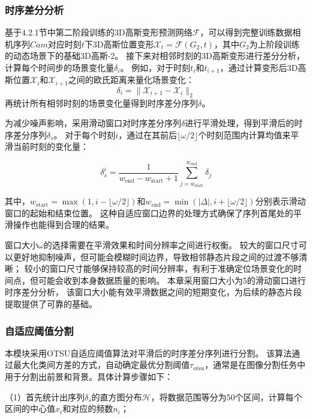 \subsubsection{时序差分分析}
基于4.2.1节中第二阶段训练的3D高斯变形预测网络$\mathcal{F}$，可以得到完整训练数据相机序列$Cam$对应时刻$t$下3D高斯位置变形$\mathcal{X}_t=\mathcal{F}(G_2, t)$，其中$G_2$为上阶段训练的动态场景下的基础3D高斯-2。
接下来对相邻时刻的3D高斯变形进行差分分析，计算每个时间步的场景变化量$\delta_i$。
例如，对于时刻$t_i$和$t_{i+1}$，通过计算变形后3D高斯位置$\mathcal{X}_i$和$\mathcal{X}_{i+1}$之间的欧氏距离来量化场景变化：
\begin{equation}
\delta_i = \|\mathcal{X}_{i+1} - \mathcal{X}_i\|_2
\end{equation}
再统计所有相邻时刻的场景变化量得到时序差分序列$\delta$。

为减少噪声影响，采用滑动窗口对时序差分序列$\delta$进行平滑处理，得到平滑后的时序差分序列$\delta_s$。
对于每个时刻$i$，通过在其前后$\lfloor\omega/2\rfloor$个时刻范围内计算均值来平滑当前时刻的变化量：

\begin{equation}
\delta_s^i = \frac{1}{w_{\text{end}} - w_{\text{start}} + 1} \sum_{j=w_{\text{start}}}^{w_{\text{end}}} \delta_j
\end{equation}

其中，$w_{\text{start}} = \max(1, i - \lfloor\omega/2\rfloor)$和$w_{\text{end}} = \min(|\Delta|, i + \lfloor\omega/2\rfloor)$分别表示滑动窗口的起始和结束位置。
这种自适应窗口边界的处理方式确保了序列首尾处的平滑操作也能得到合理的结果。

窗口大小$\omega$的选择需要在平滑效果和时间分辨率之间进行权衡。
较大的窗口尺寸可以更好地抑制噪声，但可能会模糊时间边界，导致相邻静态片段之间的过渡不够清晰；
较小的窗口尺寸能够保持较高的时间分辨率，有利于准确定位场景变化的时间点，但可能会收到本身数据质量的影响。
本章采用窗口大小为5的滑动窗口进行时序差分分析，
该窗口大小能有效平滑数据之间的短期变化，为后续的静态片段提取提供了可靠的基础。

\subsubsection{自适应阈值分割}
本模块采用OTSU自适应阈值算法\cite{otsu}对平滑后的时序差分序列进行分割。
该算法通过最大化类间方差的方式，自动确定最优分割阈值$\tau_{\text{otsu}}$，通常是在图像分割任务中用于分割出前景和背景。具体计算步骤如下：

（1）首先统计出序列$\delta_s$的直方图分布$\mathcal{H}$，将数据范围等分为50个区间，计算每个区间的中心值$x_i$和对应的频数$n_i$；

